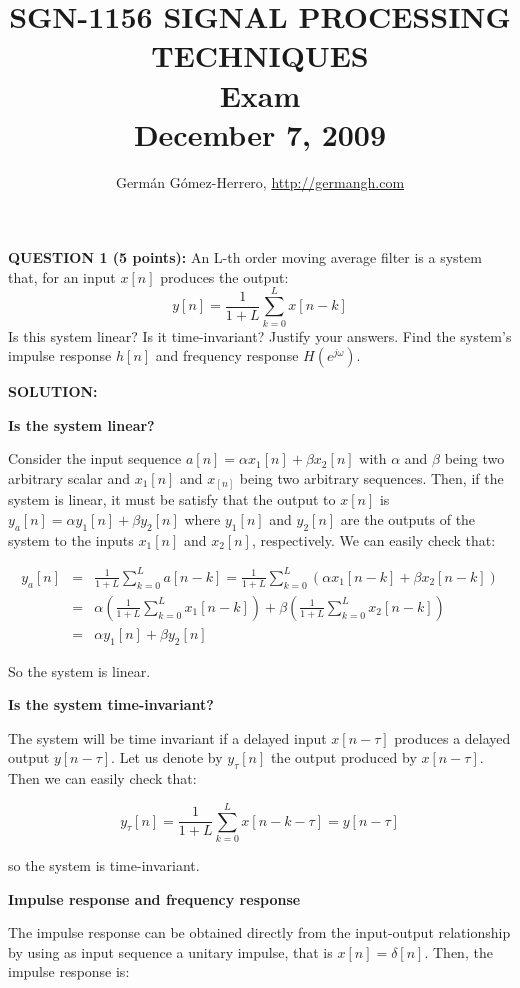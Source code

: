 \documentclass[a4paper,11pt,oneside]{article}
\title{\large{\textbf{SGN-1156 SIGNAL PROCESSING TECHNIQUES}}\\
Exam\\
December 7, 2009}
\date{Germ\'an G\'omez-Herrero, \url{http://germangh.com}}
\begin{document}
\maketitle



\textbf{QUESTION 1 (5 points):} An L-th order moving average filter is a system that, for an input $x[n]$ produces the output:
\[
y[n] = \frac{1}{1+L}\sum_{k=0}^{L}x[n-k]
\]
Is this system linear? Is it time-invariant? Justify your answers. Find the system's impulse response $h[n]$ and frequency response $H(e^{j\omega})$.

\vspace{1cm}

\textbf{SOLUTION:}

\textbf{Is the system linear?}

Consider the input sequence $a[n]=\alpha x_1[n]+\beta x_2[n]$ with $\alpha$ and $\beta$ being two arbitrary scalar and $x_1[n]$ and $x_[n]$ being two arbitrary sequences. Then, if the system is linear, it must be satisfy that the output to $x[n]$ is $y_a[n]=\alpha y_1[n] + \beta y_2[n]$ where $y_1[n]$ and $y_2[n]$ are the outputs of the system to the inputs $x_1[n]$ and $x_2[n]$, respectively. We can easily check that:

\[
\begin{array}{lll}
y_a[n] &=& \frac{1}{1+L}\sum_{k=0}^{L}a[n-k]=\frac{1}{1+L}\sum_{k=0}^{L} \left(\alpha x_1[n-k]+\beta x_2[n-k]\right)\\
&=&\alpha\left(\frac{1}{1+L}\sum_{k=0}^{L}x_1[n-k]\right)+\beta\left(\frac{1}{1+L}\sum_{k=0}^{L}x_2[n-k]\right)\\
&=&\alpha y_1[n] + \beta y_2[n]
\end{array}
\]

So the system is linear.

\textbf{Is the system time-invariant?}

The system will be time invariant if a delayed input $x[n-\tau]$ produces a delayed output $y[n-\tau]$. Let us denote by $y_\tau[n]$ the output produced by $x[n-\tau]$. Then we can easily check that:

\[
y_\tau[n] = \frac{1}{1+L}\sum_{k=0}^{L}x[n-k-\tau]=y[n-\tau]
\]

so the system is time-invariant.

\textbf{Impulse response and frequency response}

The impulse response can be obtained directly from the input-output relationship by using as input sequence a unitary impulse, that is $x[n]=\delta[n]$. Then, the impulse response is:
\end{document}
